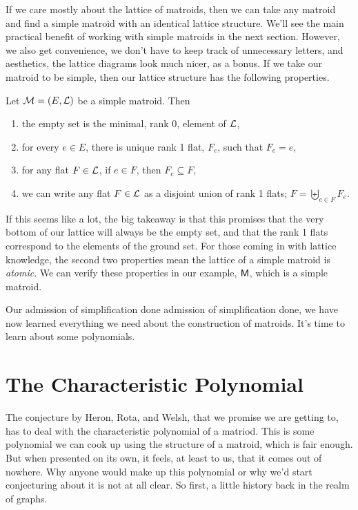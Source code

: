 \documentclass[12pt,oneside]{../../sfsuthesis}
\begin{document}
If we care mostly about the lattice of matroids, then we can take any matroid and find a simple matroid with an identical lattice structure.
We'll see the main practical benefit of working with simple matroids in the next section.
However, we also get convenience, we don't have to keep track of unnecessary letters, and aesthetics, the lattice diagrams look much nicer, as a bonus.
If we take our matroid to be simple, then our lattice structure has the following properties.

\begin{proposition}\th\label{thm:simpMatroidProps}
    Let \( \mathcal{M} = (E, \mathcal{L}) \) be a simple matroid.
    Then
    \begin{enumerate}[label=\roman*.]
        \item the empty set is the minimal, rank 0, element of \( \mathcal{L} \),
        \item for every \( e \in E \), there is unique rank 1 flat, \( F_e \), such that \( F_e = e \),
        \item for any flat \( F \in \mathcal{L} \), if \( e \in F \), then \( F_e \subseteq F \),
        \item we can write any flat \( F \in \mathcal{L} \) as a disjoint union of rank 1 flats; \( F = \biguplus_{e \in F}F_e \).
    \end{enumerate}
\end{proposition}

If this seems like a lot, the big takeaway is that this promises that the very bottom of our lattice will always be the empty set, and that the rank 1 flats correspond to the elements of the ground set.
For those coming in with lattice knowledge, the second two properties mean the lattice of a simple matroid is \emph{atomic}.
We can verify these properties in our example, \( \mathsf{M} \), which is a simple matroid.

Our admission of simplification done admission of simplification done, we have now learned everything we need about the construction of matroids.
It's time to learn about some polynomials.

\section{The Characteristic Polynomial}

The conjecture by Heron, Rota, and Welsh, that we promise we are getting to, has to deal with the characteristic polynomial of a matriod.
This is some polynomial we can cook up using the structure of a matroid, which is fair enough.
But when presented on its own, it feels, at least to us, that it comes out of nowhere.
Why anyone would make up this polynomial or why we'd start conjecturing about it is not at all clear.
So first, a little history back in the realm of graphs.
\end{document}
